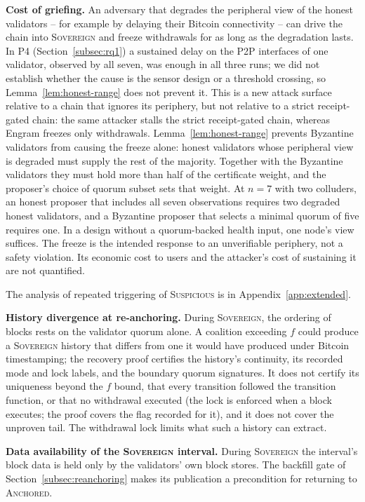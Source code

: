 \textbf{Cost of griefing.} An adversary that degrades the peripheral view of
the honest validators -- for example by delaying their Bitcoin
connectivity -- can drive the chain into \textsc{Sovereign} and freeze
withdrawals for as long as the degradation lasts. In P4 (Section~\ref{subsec:rq1}) a sustained delay on the P2P interfaces of one validator, observed by all seven, was enough in all three runs; we did not establish whether the cause is the sensor design or a threshold crossing, so Lemma~\ref{lem:honest-range} does not prevent it. This is a new attack surface relative to a chain
that ignores its periphery, but not relative to a strict receipt-gated chain: the same
attacker stalls the strict receipt-gated chain, whereas Engram freezes only
withdrawals. Lemma~\ref{lem:honest-range} prevents Byzantine validators from causing the freeze
alone: honest validators whose peripheral view is degraded must supply the
rest of the majority. Together with the Byzantine validators they must hold
more than half of the certificate weight, and the proposer's choice of quorum
subset sets that weight. At $n{=}7$ with two colluders, an honest proposer that
includes all seven observations requires two degraded honest validators, and a
Byzantine proposer that selects a minimal quorum of five requires one.
In a design without a quorum-backed health input, one node's view
suffices. The freeze is the intended response to an
unverifiable periphery, not a safety violation. Its economic cost to users and
the attacker's cost of sustaining it are not quantified.

The analysis of repeated triggering of \textsc{Suspicious} is in Appendix~\ref{app:extended}.

\textbf{History divergence at re-anchoring.} During \textsc{Sovereign}, the
ordering of blocks rests on the validator quorum alone. A coalition
exceeding $f$ could produce a \textsc{Sovereign} history that differs from
one it would have produced under Bitcoin timestamping; the recovery proof
certifies the history's continuity, its recorded mode and lock labels, and the boundary quorum signatures. It does not
certify its uniqueness beyond the $f$ bound, that every transition followed the transition function, or that no withdrawal
executed (the lock is enforced when a block executes; the proof covers the flag recorded for it), and it does not cover the
unproven tail. The withdrawal lock limits what such a history can extract.

\textbf{Data availability of the \textsc{Sovereign} interval.} During
\textsc{Sovereign} the interval's block data is held only by the validators' own
block stores. The backfill gate of Section~\ref{subsec:reanchoring} makes its
publication a precondition for returning to \textsc{Anchored}.




